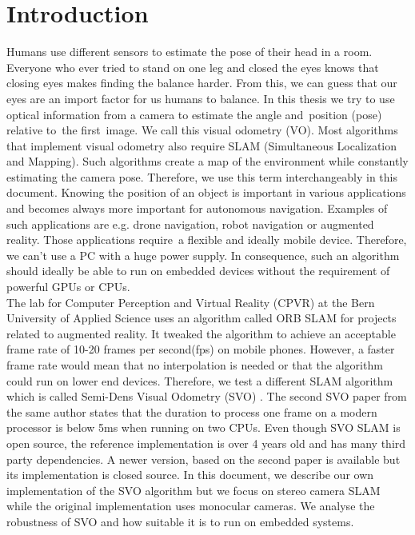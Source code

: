\documentclass[11pt,a4paper,titlepage,oneside]{report}
\begin{document}
\tableofcontents

\chapter{Introduction}

Humans use different sensors to estimate the pose of their head in a room. Everyone who ever tried to stand on one leg and closed the eyes knows that closing eyes makes finding the balance harder. From this, we can guess that our eyes are an import factor for us humans to balance. In this thesis we try to use optical information from a camera to estimate the angle and position (pose) relative to the first image. We call this visual odometry (VO). Most algorithms that implement visual odometry also require SLAM (Simultaneous Localization and Mapping). Such algorithms create a map of the environment while constantly estimating the camera pose. Therefore, we use this term interchangeably in this document. Knowing the position of an object is important in various applications and becomes always more important for autonomous navigation. Examples of such applications are e.g. drone navigation, robot navigation or augmented reality. Those applications require a flexible and ideally mobile device. Therefore, we can’t use a PC with a huge power supply. In consequence, such an algorithm should ideally be able to run on embedded devices without the requirement of powerful GPUs or CPUs.\\
The lab for Computer Perception and Virtual Reality (CPVR) at the Bern University of Applied Science uses an algorithm called ORB SLAM \cite{orbslam} for projects related to augmented reality. It tweaked the algorithm to achieve an acceptable frame rate of 10-20 frames per second(fps) on mobile phones. However, a faster frame rate would mean that no interpolation is needed or that the algorithm could run on lower end devices. Therefore, we test a different SLAM algorithm which is called Semi-Dens Visual Odometry (SVO) \cite{svo}. The second SVO paper \cite{svo2} from the same author states that the duration to process one frame on a modern processor is below 5ms when running on two CPUs. Even though SVO SLAM is open source, the reference implementation is over 4 years old and has many third party dependencies. A newer version, based on the second paper is available but its implementation is closed source. In this document, we describe our own implementation of the SVO algorithm but we focus on stereo camera SLAM while the original implementation uses monocular cameras. We analyse the robustness of SVO and how suitable it is to run on embedded systems.
\end{document}
